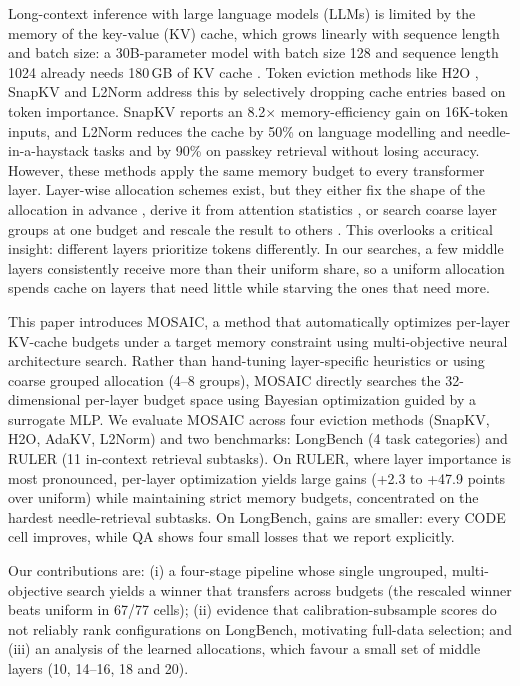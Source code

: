 \documentclass[11pt]{article}
\begin{document}
Long-context inference with large language models (LLMs) is limited by the memory of the key-value (KV) cache, which grows linearly with sequence length and batch size: a 30B-parameter model with batch size 128 and sequence length 1024 already needs 180\,GB of KV cache \citep{zhang2023h2o}. Token eviction methods like H2O \citep{zhang2023h2o}, SnapKV \citep{li2024snapkv} and L2Norm \citep{devoto2024l2norm} address this by selectively dropping cache entries based on token importance. SnapKV reports an 8.2$\times$ memory-efficiency gain on 16K-token inputs, and L2Norm reduces the cache by 50\% on language modelling and needle-in-a-haystack tasks and by 90\% on passkey retrieval without losing accuracy. However, these methods apply the same memory budget to every transformer layer. Layer-wise allocation schemes exist, but they either fix the shape of the allocation in advance \citep{cai2025pyramidkv}, derive it from attention statistics \citep{qin2025cake}, or search coarse layer groups at one budget and rescale the result to others \citep{yu2025evolkv}. This overlooks a critical insight: different layers prioritize tokens differently. In our searches, a few middle layers consistently receive more than their uniform share, so a uniform allocation spends cache on layers that need little while starving the ones that need more.

This paper introduces MOSAIC, a method that automatically optimizes per-layer KV-cache budgets under a target memory constraint using multi-objective neural architecture search. Rather than hand-tuning layer-specific heuristics or using coarse grouped allocation (4–8 groups), MOSAIC directly searches the 32-dimensional per-layer budget space using Bayesian optimization guided by a surrogate MLP. We evaluate MOSAIC across four eviction methods (SnapKV, H2O, AdaKV, L2Norm) and two benchmarks: LongBench (4 task categories) and RULER (11 in-context retrieval subtasks). On RULER, where layer importance is most pronounced, per-layer optimization yields large gains (+2.3 to +47.9 points over uniform) while maintaining strict memory budgets, concentrated on the hardest needle-retrieval subtasks. On LongBench, gains are smaller: every CODE cell improves, while QA shows four small losses that we report explicitly.

Our contributions are: (i) a four-stage pipeline whose single ungrouped, multi-objective search yields a winner that transfers across budgets (the rescaled winner beats uniform in 67/77 cells); (ii) evidence that calibration-subsample scores do not reliably rank configurations on LongBench, motivating full-data selection; and (iii) an analysis of the learned allocations, which favour a small set of middle layers (10, 14--16, 18 and 20).
\end{document}
